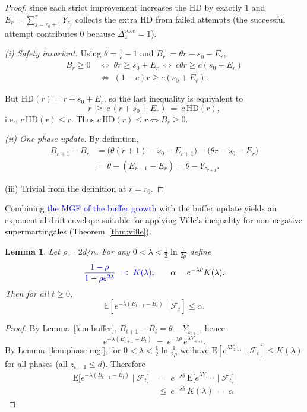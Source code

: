 \documentclass[lettersize,journal]{IEEEtran}
\newcommand{\rev}[1]{\textcolor{blue}{#1}}
\newcommand{\EE}{\text{E}}
\newcommand{\HD}{\text{HD}}
\newtheorem{lemma}{Lemma}
\begin{document}
{\begin{proof}
	since each strict improvement increases the HD by exactly $1$ and $E_r=\sum_{j=r_0+1}^r Y_{z_j}$ collects the extra HD from failed attempts (the successful attempt contributes $0$ because $\Delta_z^{\mathrm{succ}}=1$).
	
	\smallskip
	\emph{(i) Safety invariant.}
	Using $\theta=\tfrac{1}{c}-1$ and $B_r:=\theta r - s_0 - E_r$,
	\begin{align*}
		B_r\ge 0
		\ &\Longleftrightarrow\
		\theta r \ge s_0+E_r
		\ \Longleftrightarrow\
		c\theta r \ge c(s_0+E_r)
		\\ &\Longleftrightarrow\
		(1-c)r \ge c(s_0+E_r).	
	\end{align*}
	
	
	But $\HD(r)=r+s_0+E_r$, so the last inequality is equivalent to
	\[
	r \ \ge\ c\,(r+s_0+E_r)\ =\ c\,\HD(r),
	\]
	i.e., $c\,\HD(r)\le r$. Thus $c\,\HD(r)\le r \iff B_r\ge 0$.
	
	\smallskip
	\emph{(ii) One-phase update.}
	By definition,
	\begin{align*}
		B_{r+1}-B_r
		&= \bigl(\theta(r+1)-s_0-E_{r+1}\bigr) - \bigl(\theta r - s_0 - E_r\bigr)
		\\&= \theta - (E_{r+1}-E_r)
		= \theta - Y_{z_{r+1}}.
	\end{align*}
	
	
	
	\smallskip
	(iii) Trivial from the definition at $r=r_0$.
\end{proof}

Combining \rev{the MGF of the buffer growth} with the buffer update yields an exponential drift 
envelope suitable for applying \textcolor{black}{Ville's inequality for non-negative supermartingales (Theorem~\ref{thm:ville}).}

\begin{lemma}
\label{lem:drift-envelope-global}
	Let $\rho=2d/n$.  
	For any $0<\lambda<\tfrac12\ln\tfrac{1}{2\rho}$ define
	\[
	\textcolor{blue}{\frac{1-\rho}{1-\rho e^{2\lambda}} \;\eqqcolon\; K(\lambda),}
	\qquad 
	\alpha=e^{-\lambda\theta}K(\lambda).
	\]
	Then for all $t\ge0$,
	\[
	\mathbb{E}[e^{-\lambda(B_{t+1}-B_t)}\mid\mathcal{F}_t]\le \alpha.
	\]
\end{lemma}

\begin{proof}
	By Lemma~\ref{lem:buffer}, $B_{t+1}-B_t=\theta-Y_{z_{t+1}}$, hence
	\[
	e^{-\lambda(B_{t+1}-B_t)}\ =\ e^{-\lambda\theta}\,e^{\lambda Y_{z_{t+1}}}.
	\]
	By Lemma~\ref{lem:phase-mgf}, for $0<\lambda<\tfrac12\ln\!\tfrac{1}{2\rho}$ we have $\EE[e^{\lambda Y_{z_{t+1}}}\mid\mathcal F_t]\le K(\lambda)$ for all phases (all $z_{t+1}\le d$). Therefore
	\begin{align*}
		\EE\!\big[e^{-\lambda(B_{t+1}-B_t)}\mid \mathcal F_t\big]
		\ &=\ e^{-\lambda\theta}\,\EE\!\big[e^{\lambda Y_{z_{t+1}}}\mid\mathcal F_t\big]
		\ \\ &\le\ e^{-\lambda\theta}\,K(\lambda)
		\ =\ \alpha	
	\end{align*}
\end{proof}

}
\end{document}
